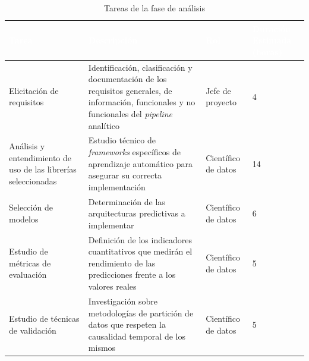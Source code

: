 \begin{table}[htp]
	\centering
	\begin{tabular}{ | m{4cm} | m{6cm} | m{2cm} | m{2cm} | }
		\hline
		\rowcolor[HTML]{5B9BD5} 
		\textcolor{white}{\textbf{Tarea}} & \textcolor{white}{\textbf{Descripción}} & \textcolor{white}{\textbf{Rol}} & \textcolor{white}{\textbf{Duración Estimada (horas)}} \\
		\hline
		
		Elicitación de requisitos & Identificación, clasificación y documentación de los requisitos generales, de información, funcionales y no funcionales del \textit{pipeline} analítico & Jefe de proyecto & 4 \\
		\hline
		Análisis y entendimiento de uso de las librerías seleccionadas & Estudio técnico de \textit{frameworks} específicos de aprendizaje automático para asegurar su correcta implementación & Científico de datos & 14 \\
		\hline
		Selección de modelos & Determinación de las arquitecturas predictivas a implementar & Científico de datos & 6 \\
		\hline
		Estudio de métricas de evaluación & Definición de los indicadores cuantitativos que medirán el rendimiento de las predicciones frente a los valores reales & Científico de datos & 5 \\
		\hline
		Estudio de técnicas de validación & Investigación sobre metodologías de partición de datos que respeten la causalidad temporal de los mismos & Científico de datos & 5 \\
		\hline
		
	\end{tabular} 
	
	\caption{Tareas de la fase de análisis}
\end{table}